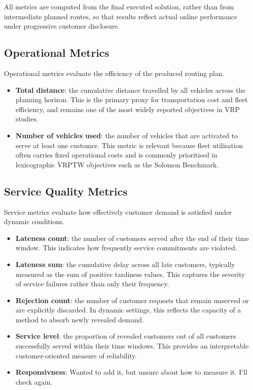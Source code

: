 All metrics are computed from the final executed solution, rather than from
intermediate planned routes, so that results reflect actual online performance
under progressive customer disclosure.


\subsection{Operational Metrics}

Operational metrics evaluate the efficiency of the produced routing plan.

\begin{itemize}
    \item \textbf{Total distance}: the cumulative distance travelled by all vehicles across the planning horizon. This is the primary proxy for transportation cost and fleet efficiency, and remains one of the most widely reported objectives in VRP studies.

    \item \textbf{Number of vehicles used}: the number of vehicles that are activated to serve at least one customer. This metric is relevant because fleet utilisation often carries fixed operational costs and is commonly prioritised in lexicographic VRPTW objectives such as the Solomon Benchmark.
\end{itemize}

\subsection{Service Quality Metrics}

Service metrics evaluate how effectively customer demand is satisfied under
dynamic conditions.

\begin{itemize}
    \item \textbf{Lateness count}: the number of customers served after the end of their time window. This indicates how frequently service commitments are violated.

    \item \textbf{Lateness sum}: the cumulative delay across all late customers, typically measured as the sum of positive tardiness values. This captures the severity of service failures rather than only their frequency.

    \item \textbf{Rejection count}: the number of customer requests that remain unserved or are explicitly discarded. In dynamic settings, this reflects the capacity of a method to absorb newly revealed demand.

    \item \textbf{Service level}: the proportion of revealed customers out of all customers successfully served within their time windows. This provides an interpretable customer-oriented measure of reliability.
    \item \textbf{Responsivness}: {\color{red} Wanted to add it, but unsure about how to measure it. I'll check \cite{AntColonySchyns2015} again.}
\end{itemize}


